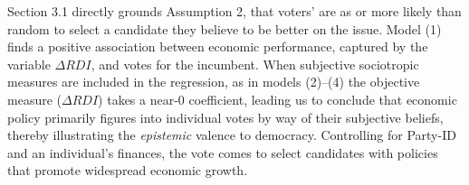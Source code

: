\documentclass[11pt]{article}
\begin{document}


Section 3.1 directly grounds Assumption 2, that voters' are as or more likely than random to select a candidate they believe to be better on the issue. %
Model (1) finds a positive association between economic performance, captured by the variable $\Delta RDI$, and votes for the incumbent. When subjective sociotropic measures are included in the regression, as in models (2)--(4) the objective measure ($\Delta RDI$) takes a near-0 coefficient, leading us to conclude that economic policy primarily figures into individual votes by way of their subjective beliefs, thereby illustrating the \emph{epistemic} valence to democracy. Controlling for Party-ID and an individual's finances, the vote comes to select candidates with policies that promote widespread economic growth.%
\end{document}
